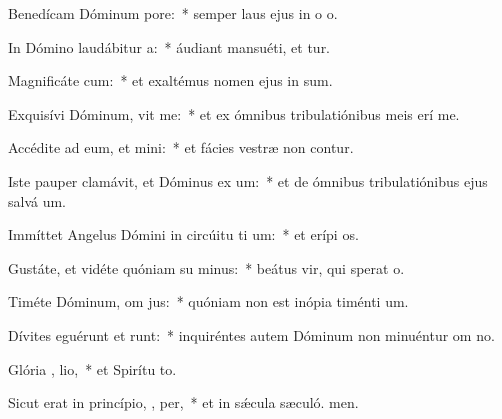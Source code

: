 \item Benedícam Dóminum   pore:~* semper laus ejus in o o.
\item In Dómino laudábitur  a:~* áudiant mansuéti, et tur.
\item Magnificáte  cum:~* et exaltémus nomen ejus in sum.
\item Exquisívi Dóminum,  vit me:~* et ex ómnibus tribulatiónibus meis erí me.
\item Accédite ad eum, et mini:~* et fácies vestræ non contur.
\item Iste pauper clamávit, et Dóminus ex um:~* et de ómnibus tribulatiónibus ejus salvá um.
\item Immíttet Angelus Dómini in circúitu ti um:~* et erípi os.
\item Gustáte, et vidéte quóniam su  minus:~* beátus vir, qui sperat  o.
\item Timéte Dóminum, om  jus:~* quóniam non est inópia timénti um.
\item Dívites eguérunt et runt:~* inquiréntes autem Dóminum non minuéntur om no.
\item Glória ,  lio,~* et Spirítu to.
\item Sicut erat in princípio,  ,  per,~* et in sǽcula sæculó. men.
